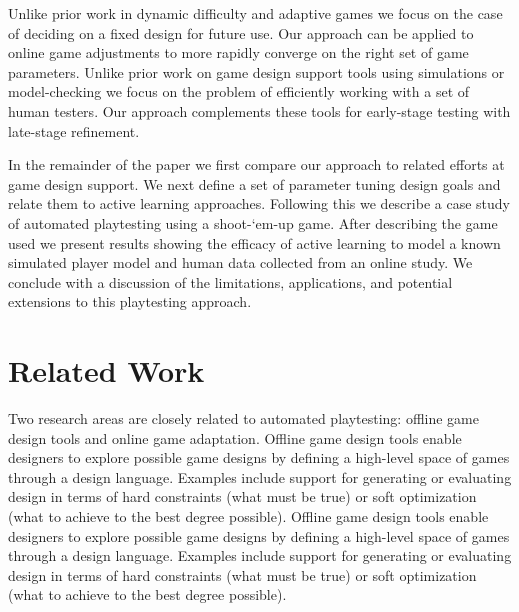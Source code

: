 \documentclass{sig-alternate}
\begin{document}
Unlike prior work in dynamic difficulty and adaptive games we focus on the case of deciding on a fixed design for future use.
Our approach can be applied to online game adjustments to more rapidly converge on the right set of game parameters.
Unlike prior work on game design support tools using simulations or model-checking we focus on the problem of efficiently working with a set of human testers.
Our approach complements these tools for early-stage testing with late-stage refinement.

In the remainder of the paper we first compare our approach to related efforts at game design support.
We next define a set of parameter tuning design goals and relate them to active learning approaches.
Following this we describe a case study of automated playtesting using a shoot-`em-up game.
After describing the game used we present results showing the efficacy of active learning to model a known simulated player model and human data collected from an online study.
We conclude with a discussion of the limitations, applications, and potential extensions to this playtesting approach.




\section{Related Work}

Two research areas are closely related to automated playtesting: offline game design tools and online game adaptation.
Offline game design tools enable designers to explore possible game designs by defining a high-level space of games through a design language.
Examples include support for generating or evaluating design in terms of hard constraints (what must be true) or soft optimization (what to achieve to the best degree possible).
Offline game design tools enable designers to explore possible game designs by defining a high-level space of games through a design language.
Examples include support for generating or evaluating design in terms of hard constraints (what must be true) or soft optimization (what to achieve to the best degree possible).
\end{document}
